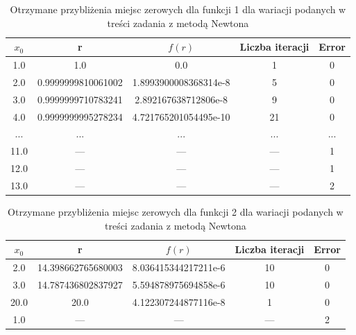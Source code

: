 \documentclass[a4paper,14pt]{report}
\begin{document}
    \begin{table}[H]
    \centering
    \begin{tabular}{|c | c | c | c | c |} 
     \hline
     $x_{0}$ & r & $f(r)$ & Liczba iteracji & Error \\ [0.5ex] 
     \hline\hline
     1.0 & 1.0 & 0.0 & 1 & 0 \\
     2.0 & 0.9999999810061002 & 1.8993900008368314e-8 & 5 & 0 \\ 
     3.0 & 0.9999999710783241 & 2.892167638712806e-8 & 9 & 0 \\ 
     4.0 & 0.9999999995278234 & 4.721765201054495e-10 & 21 & 0 \\ 
     ... & ... & ... & ... & ...\\
     11.0 & --- & --- & --- & 1 \\
     12.0 & --- & --- & --- & 1 \\
     13.0 & --- & --- & --- & 2 \\
     \hline
    \end{tabular}
    \caption{Otrzymane przybliżenia miejsc zerowych dla funkcji 1 dla wariacji podanych w treści zadania z metodą Newtona}
    \label{Zad6WynikiNewtonA}
    \end{table}

    \begin{table}[H]
    \centering
    \begin{tabular}{|c | c | c | c | c |} 
     \hline
     $x_{0}$ & r & $f(r)$ & Liczba iteracji & Error \\ [0.5ex] 
     \hline\hline
     2.0 & 14.398662765680003 & 8.036415344217211e-6 & 10 & 0 \\
     3.0 & 14.787436802837927 & 5.594878975694858e-6 & 10 & 0 \\
     20.0 & 20.0 & 4.122307244877116e-8 & 1 & 0 \\
     1.0 & --- & --- & --- & 2 \\
     \hline
    \end{tabular}
    \caption{Otrzymane przybliżenia miejsc zerowych dla funkcji 2 dla wariacji podanych w treści zadania z metodą Newtona}
    \label{Zad6WynikiNewtonB}
    \end{table}
\end{document}
